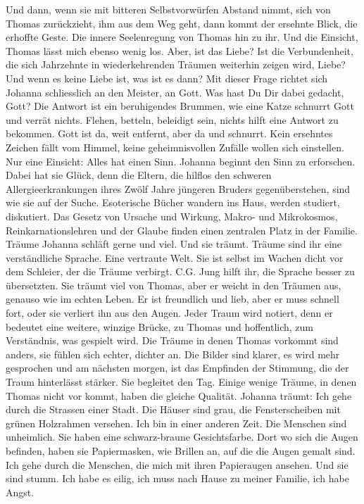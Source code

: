 Und dann, wenn sie mit bitteren Selbstvorwürfen Abstand nimmt, sich von Thomas zurückzieht, ihm aus dem Weg geht, dann kommt der ersehnte Blick, die erhoffte Geste. Die innere Seelenregung von Thomas hin zu ihr. Und die Einsicht, Thomas lässt mich ebenso wenig los.
Aber, ist das Liebe? Ist die Verbundenheit, die sich Jahrzehnte in wiederkehrenden Träumen weiterhin zeigen wird, Liebe? Und wenn es keine Liebe ist, was ist es dann?
Mit dieser Frage richtet sich Johanna schliesslich an den Meister, an Gott. Was hast Du Dir dabei gedacht, Gott? Die Antwort ist ein beruhigendes Brummen, wie eine Katze schnurrt Gott und verrät nichts. Flehen, betteln, beleidigt sein, nichts hilft eine Antwort zu bekommen. Gott ist da, weit entfernt, aber da und schnurrt. Kein ersehntes Zeichen fällt vom Himmel, keine geheimnisvollen Zufälle wollen sich einstellen. Nur eine Einsicht: Alles hat einen Sinn.
Johanna beginnt den Sinn zu erforschen. Dabei hat sie Glück, denn die Eltern, die hilflos den schweren Allergieerkrankungen ihres Zwölf Jahre jüngeren Bruders gegenüberstehen, sind wie sie auf der Suche. Esoterische Bücher wandern ins Haus, werden studiert, diskutiert. Das Gesetz von Ursache und Wirkung, Makro- und Mikrokosmos, Reinkarnationslehren und der Glaube finden einen zentralen Platz in der Familie.
Träume
Johanna schläft gerne und viel. Und sie träumt. Träume sind ihr eine verständliche Sprache. Eine vertraute Welt. Sie ist selbst im Wachen dicht vor dem Schleier, der die Träume verbirgt. C.G. Jung hilft ihr, die Sprache besser zu übersetzten.
Sie träumt viel von Thomas, aber er weicht in den Träumen aus, genauso wie im echten Leben. Er ist freundlich und lieb, aber er muss schnell fort, oder sie verliert ihn aus den Augen. Jeder Traum wird notiert, denn er bedeutet eine weitere, winzige Brücke, zu Thomas und hoffentlich, zum Verständnis, was gespielt wird. Die Träume in denen Thomas vorkommt sind anders, sie fühlen sich echter, dichter an. Die Bilder sind klarer, es wird mehr gesprochen und am nächsten morgen, ist das Empfinden der Stimmung, die der Traum hinterlässt stärker. Sie begleitet den Tag.
Einige wenige Träume, in denen Thomas nicht vor kommt, haben die gleiche Qualität.
Johanna träumt:
Ich gehe durch die Strassen einer Stadt. Die Häuser sind grau, die Fensterscheiben mit grünen Holzrahmen versehen. Ich bin in einer anderen Zeit. Die Menschen sind unheimlich. Sie haben eine schwarz-braune Gesichtsfarbe. Dort wo sich die Augen befinden, haben sie Papiermasken, wie Brillen an, auf die die Augen gemalt sind. Ich gehe durch die Menschen,  die mich mit ihren Papieraugen ansehen. Und sie sind stumm. Ich habe es eilig, ich muss nach Hause zu meiner Familie, ich habe Angst.

